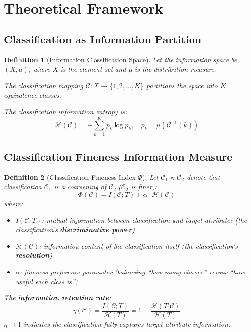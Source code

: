 \documentclass[12pt, a4paper]{article}
\newtheorem{definition}{Definition}[section]
\begin{document}
\begin{center}
\end{center}

\section{Theoretical Framework}

\subsection{Classification as Information Partition}

\begin{definition}[Information Classification Space]\label{def:D16-1}
Let the information space be $(X, \mu)$, where $X$ is the element set and $\mu$ is the distribution measure.

The classification mapping $\mathcal{C}: X \to \{1, 2, \ldots, K\}$ partitions the space into $K$ equivalence classes.

The classification information entropy is:
\[
\mathcal{H}(\mathcal{C}) = -\sum_{k=1}^{K} p_k \log p_k,\quad p_k = \mu(\mathcal{C}^{-1}(k))
\]
\end{definition}

\subsection{Classification Fineness Information Measure}

\begin{definition}[Classification Fineness Index $\Phi$]\label{def:D16-2}
Let $\mathcal{C}_1 \preceq \mathcal{C}_2$ denote that classification $\mathcal{C}_1$ is a coarsening of $\mathcal{C}_2$ ($\mathcal{C}_2$ is finer):
\[
\Phi(\mathcal{C}) = I(\mathcal{C}; T) + \alpha \cdot \mathcal{H}(\mathcal{C})
\]
where:
\begin{itemize}
    \item $I(\mathcal{C}; T)$: mutual information between classification and target attributes (the classification's \textbf{discriminative power})
    \item $\mathcal{H}(\mathcal{C})$: information content of the classification itself (the classification's \textbf{resolution})
    \item $\alpha$: fineness preference parameter (balancing ``how many classes'' versus ``how useful each class is'')
\end{itemize}

The \textbf{information retention rate}:
\[
\eta(\mathcal{C}) = \frac{I(\mathcal{C}; T)}{\mathcal{H}(T)} = 1 - \frac{\mathcal{H}(T|\mathcal{C})}{\mathcal{H}(T)}
\]
$\eta \to 1$ indicates the classification fully captures target attribute information.
\end{definition}
\end{document}
